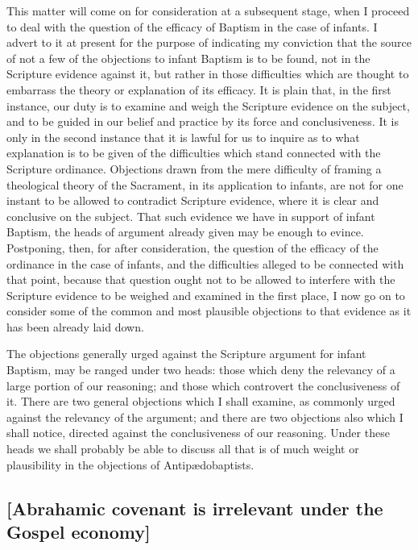 \documentclass[
  english,
]{book}
\begin{document}
This matter will come on for consideration at a subsequent stage, when I proceed to deal with the question of the efficacy of Baptism in the case of infants. I advert to it at present for the purpose of indicating my conviction that the source of not a few of the objections to infant Baptism is to be found, not in the Scripture evidence against it, but rather in those difficulties which are thought to embarrass the theory or explanation of its efficacy. It is plain that, in the first instance, our duty is to examine and weigh the Scripture evidence on the subject, and to be guided in our belief and practice by its force and conclusiveness. It is only in the second instance that it is lawful for us to inquire as to what explanation is to be given of the difficulties which stand connected with the Scripture ordinance. Objections drawn from the mere difficulty of framing a theological theory of the Sacrament, in its application to infants, are not for one instant to be allowed to contradict Scripture evidence, where it is clear and conclusive on the subject. That such evidence we have in support of infant Baptism, the heads of argument already given may be enough to evince. Postponing, then, for after consideration, the question of the efficacy of the ordinance in the case of infants, and the difficulties alleged to be connected with that point, because that question ought not to be allowed to interfere with the Scripture evidence to be weighed and examined in the first place, I now go on to consider some of the common and most plausible objections to that evidence as it has been already laid down.

The objections generally urged against the Scripture argument for infant Baptism, may be ranged under two heads: those which deny the relevancy of a large portion of our reasoning; and those which controvert the conclusiveness of it. There are two general objections which I shall examine, as commonly urged against the relevancy of the argument; and there are two objections also which I shall notice, directed against the conclusiveness of our reasoning. Under these heads we shall probably be able to discuss all that is of much weight or plausibility in the objections of Antipædobaptists.

\hypertarget{abrahamic-covenant-is-irrelevant-under-the-gospel-economy}{%
\subsection{{[}Abrahamic covenant is irrelevant under the Gospel economy{]}}\label{abrahamic-covenant-is-irrelevant-under-the-gospel-economy}}
\end{document}
